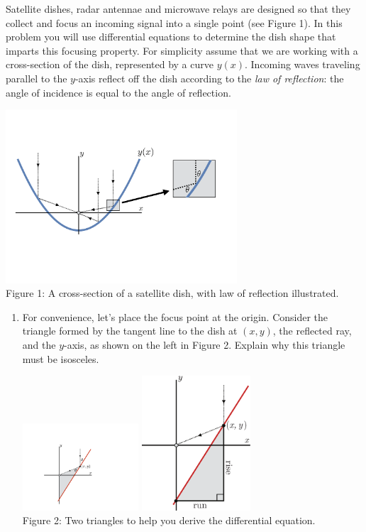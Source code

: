\documentclass[12pt,letterpaper]{hmcpset}
\begin{document}
\begin{problem}[7]
  Satellite dishes, radar antennae and microwave relays are designed so that they collect and focus an incoming signal into a single point (see Figure 1).  In this problem you will use differential equations to determine the dish shape that imparts this focusing property.  For simplicity assume that we are working with a cross-section of the dish, represented by a curve $y(x)$.  Incoming waves traveling parallel to the $y$-axis reflect off the dish according to the {\it law of reflection}:  the angle of incidence is equal to the angle of reflection.
  	\parbox[c]{6in}{
  	\centering
  	\includegraphics[width=3.4in]{img/mar_22_7}\\
  	Figure 1: A cross-section of a satellite dish, with law of reflection illustrated.}  
  \begin{enumerate}
  	\item For convenience, let's place the focus point at the origin. Consider the triangle formed by the tangent line to the dish at $(x,y)$, the reflected ray, and the $y$-axis, as shown on the left in Figure 2. Explain why this triangle must be isosceles.
  	  \parbox[c]{6in}{
  	  	\centering
  		\includegraphics[width=1.7in]{img/mar_22_7a1}\qquad\qquad 
  		\includegraphics[width=1.6in]{img/mar_22_7a2}\\ Figure 2: Two triangles to help you derive the differential equation.}

\end{enumerate}
\end{problem}
\end{document}
